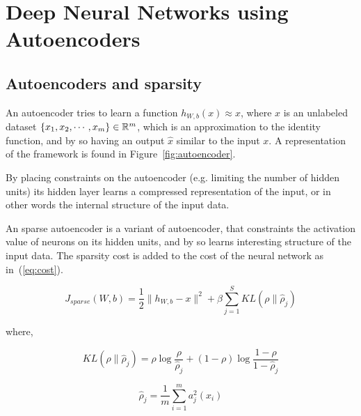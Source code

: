 \documentclass{comjnl}
\begin{document}
\section{Deep Neural Networks using Autoencoders} \label{NeuralNetworkIntro}

\subsection{Autoencoders and sparsity}
An autoencoder tries to learn a function $h_{W,b}(x) \approx x$, where
$x$ is an unlabeled dataset $\{x_{1}, x_{2}, \cdots, x_{m}\} \in \Bbb R ^{m}$,
which is an approximation to the identity function, and by so having an output
$\hat{x}$ similar to the input $x$. A representation of the framework is found
in Figure~\ref{fig:autoencoder}.

By placing constraints on the autoencoder (e.g. limiting the number of hidden
units) its hidden layer learns a compressed representation of the input, or in
other words the internal structure of the input data.

An sparse autoencoder is a variant of autoencoder, that constraints the activation
value of neurons on its hidden units, and by so learns interesting structure of the input
data. The sparsity cost is added to the cost of the neural network as in~(\ref{eq:cost}).

\begin{equation}\label{eq:cost}
    J_{sparse}(W, b) = \frac{1}{2} \|h_{W, b}-x\|^{2} + \beta \sum_{j=1}^{S}{KL(\rho\|\hat{\rho}_{j})}
\end{equation}

where,

\begin{equation}
    KL(\rho\|\hat{\rho}_{j}) = \rho \log{\frac{\rho}{\hat{\rho}_{j}}} + (1-\rho) \log{\frac{1-\rho}{1-\hat{\rho}_{j}}} 
\end{equation}

\begin{equation}
    \hat{\rho}_{j} = \frac{1}{m} \sum_{i=1}^{m}{a_{j}^{2}(x_{i})}
\end{equation}
\end{document}
